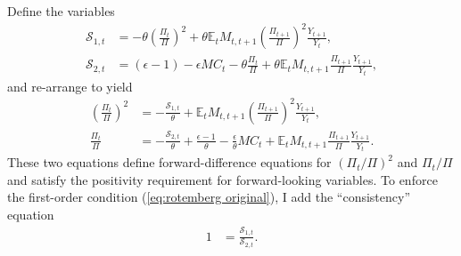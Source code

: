 \documentclass[12 pt, oneside]{article}
\theoremstyle{definition}
\theoremstyle{definition}
\theoremstyle{definition}
\newcommand{\E}{\mathbb{E}}
\newcommand{\calS}{\mathcal{S}}
\begin{document}
Define the variables
\begin{align}
  \calS_{1, t} & = -\theta\left(\frac{\Pi_t}{\Pi}\right)^2 + \theta\E_t M_{t, t + 1}\left(\frac{\Pi_{t + 1}}{\Pi}\right)^2\frac{Y_{t + 1}}{Y_t},\\
  \calS_{2, t} & = (\epsilon - 1) - \epsilon MC_t - \theta \frac{\Pi_t}{\Pi} + \theta\E_t M_{t, t + 1}\frac{\Pi_{t + 1}}{\Pi}\frac{Y_{t + 1}}{Y_t},
\end{align}
and re-arrange to yield
\begin{align}
  \left(\frac{\Pi_t}{\Pi}\right)^2 & = - \frac{\calS_{1, t}}{\theta} + \E_t M_{t, t + 1}\left(\frac{\Pi_{t + 1}}{\Pi}\right)^2\frac{Y_{t + 1}}{Y_t},\\
  \frac{\Pi_t}{\Pi} & = - \frac{\calS_{2, t}}{\theta} + \frac{\epsilon - 1}{\theta} - \frac{\epsilon}{\theta} MC_t  + \E_t M_{t, t + 1}\frac{\Pi_{t + 1}}{\Pi}\frac{Y_{t + 1}}{Y_t}.
\end{align}
These two equations define forward-difference equations for $(\Pi_t / \Pi)^2$ and $\Pi_t / \Pi$ and satisfy the positivity requirement
for forward-looking variables. To enforce the first-order condition (\ref{eq:rotemberg original}), I add the ``consistency'' equation
\begin{align}
  1 & = \frac{\calS_{1, t}}{\calS_{2, t}}.
\end{align}
\end{document}
